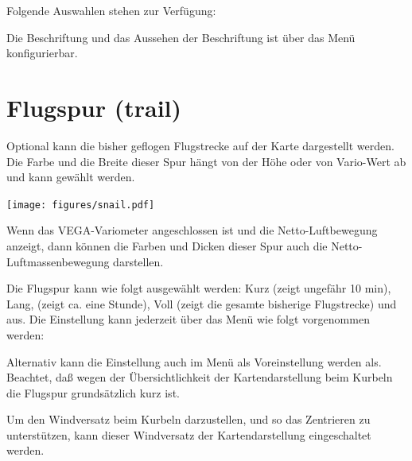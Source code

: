 Folgende Auswahlen stehen zur Verfügung:


Die Beschriftung und das Aussehen der Beschriftung ist über das Menü  konfigurierbar.

\section{Flugspur (trail)}\label{sec:trail}

Optional kann die bisher geflogen Flugstrecke auf der Karte dargestellt werden. Die Farbe und die Breite dieser Spur hängt von der Höhe oder von Vario-Wert ab und kann gewählt werden. 

\begin{center}
\texttt{[image: figures/snail.pdf]}
\end{center}

Wenn das VEGA-Variometer angeschlossen ist und die Netto-Luftbewegung anzeigt, dann können die Farben und Dicken dieser Spur auch die Netto-Luftmassenbewegung darstellen.

Die Flugspur kann wie folgt ausgewählt werden: Kurz (zeigt ungefähr 10 min), Lang, (zeigt ca. eine Stunde), Voll (zeigt die gesamte bisherige Flugstrecke) und aus. Die Einstellung kann jederzeit über das Menü wie folgt vorgenommen werden:

\begin{quote}
\blink{}\blink{}\blink{}
\end{quote}

Alternativ kann die Einstellung auch im Menü   als Voreinstellung werden als.
Beachtet, daß wegen der Übersichtlichkeit der Kartendarstellung beim Kurbeln die Flugspur grundsätzlich kurz ist.

Um den Windversatz beim Kurbeln darzustellen, und so das Zentrieren zu unterstützen, kann dieser Windversatz der Kartendarstellung eingeschaltet werden.

